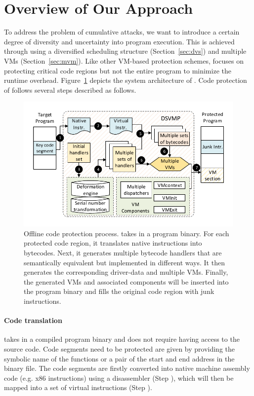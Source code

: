 \section{Overview of Our Approach}\label{sec:overview}
To address the problem of cumulative attacks, we want to introduce a certain
degree of diversity and uncertainty into program execution. This is achieved
through using a diversified scheduling structure (Section~\ref {sec:dvs}) and
multiple VMs (Section~\ref {sec:mvm}). Like other VM-based protection schemes,
\DSVMP focuses on protecting critical code regions but not the entire program to minimize the runtime overhead.
Figure~\ref{fig:Fig.overview} depicts the system architecture of \DSVMP.
Code protection of \DSVMP follows several steps described as follows.

\begin{figure}[!t]
  \centering
  \includegraphics[width=0.7\columnwidth]{figure/figoverview.pdf}
  \caption{Offline code protection process. \DSVMP takes in a program binary. For each protected code region, it translates native instructions into bytecodes. Next, it generates multiple bytecode handlers that are semantically equivalent but implemented in different ways. It then generates the corresponding driver-data and multiple VMs. Finally, the generated VMs and associated components will be inserted into the program binary and fills the original code region with junk instructions.}\label{fig:Fig.overview}
\end{figure}

\paragraph*{Code translation} \DSVMP takes in a compiled program binary and
does not require having access to the source code. Code segments need to be
protected are given by providing the symbolic name of the functions or a pair
of the start and end address in the binary file. The code segments are
firstly converted into native machine assembly code (e.g. x86 instructions)
using a disassembler (Step ), which will then be mapped into a set of virtual instructions (Step ).

